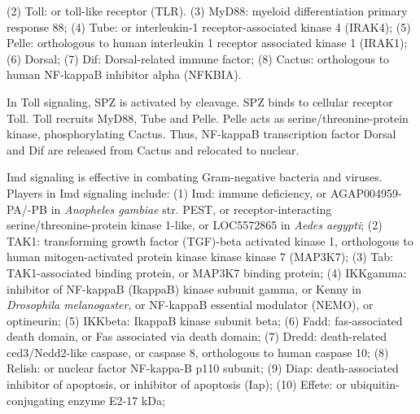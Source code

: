 \documentclass[11pt]{article}
\begin{document}
\begin{sloppypar}
(2) Toll: or toll-like receptor (TLR). \newline 
(3) MyD88: myeloid differentiation primary response 88; \newline
(4) Tube: or interleukin-1 receptor-associated kinase 4 (IRAK4); \newline
(5) Pelle: orthologous to human interleukin 1 receptor associated kinase 1 (IRAK1); \newline
(6) Dorsal; \newline 
(7) Dif: Dorsal-related immune factor; \newline
(8) Cactus: orthologous to human NF-kappaB inhibitor alpha (NFKBIA).
\par
In Toll signaling, SPZ is activated by cleavage. 
SPZ binds to cellular receptor Toll. 
Toll recruits MyD88, Tube and Pelle. 
Pelle acts as serine/threonine-protein kinase, phosphorylating Cactus. 
Thus, NF-kappaB transcription factor Dorsal and Dif are released from Cactus and relocated to nuclear.
\par
Imd signaling is effective in combating Gram-negative bacteria and viruses. 
Players in Imd signaling include: 
\newline
(1) Imd: immune deficiency, or AGAP004959-PA/-PB in \textit{Anopheles gambiae} str. PEST, or receptor-interacting serine/threonine-protein kinase 1-like, or LOC5572865 in \textit{Aedes aegypti}; \newline
(2) TAK1: transforming growth factor (TGF)-beta activated kinase 1, orthologous to human mitogen-activated protein kinase kinase kinase 7 (MAP3K7); \newline
(3) Tab: TAK1-associated binding protein, or MAP3K7 binding protein; \newline
(4) IKKgamma: inhibitor of NF-kappaB (IkappaB) kinase subunit gamma, or Kenny in \textit{Drosophila melanogaster}, or NF-kappaB essential modulator (NEMO), or optineurin; \newline
(5) IKKbeta: IkappaB kinase subunit beta; \newline
(6) Fadd: fas-associated death domain, or Fas associated via death domain; \newline
(7) Dredd: death-related ced3/Nedd2-like caspase, or caspase 8, orthologous to human caspase 10; 
\newline
(8) Relish: or nuclear factor NF-kappa-B p110 subunit; \newline
(9) Diap: death-associated inhibitor of apoptosis, or inhibitor of apoptosis (Iap); \newline
(10) Effete: or ubiquitin-conjugating enzyme E2-17 kDa; \newline

\end{sloppypar}
\end{document}

